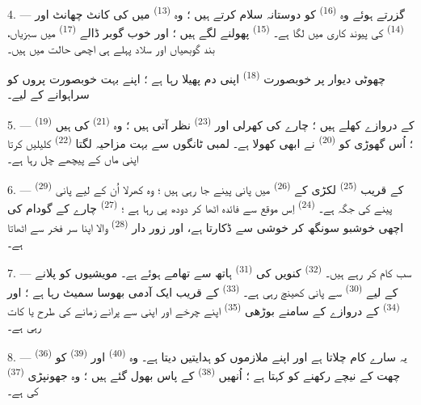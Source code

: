 4. --- گزرتے ہوئے وہ  \textsuperscript{(16)} کو دوستانہ
سلام کرتے ہیں ؛ وہ  \textsuperscript{(13)} میں
 کی کانٹ چھانٹ اور 
\textsuperscript{(14)} کی پیوند کاری میں لگا ہے۔  \textsuperscript{(15)} پھولنے لگے ہیں ؛ اور خوب گوبر ڈالے
 \textsuperscript{(17)} میں سبزیاں، بند گوبھیاں
اور سلاد پہلے ہی اچھی حالت میں ہیں۔

چھوٹی دیوار پر خوبصورت  \textsuperscript{(18)} اپنی دم
پھیلا رہا ہے ؛ اپنے بہت خوبصورت پروں کو سراہوانے کے لیے۔

\VUsaut{3.0mm}

5. ---  \textsuperscript{(19)} کے دروازے کھلے ہیں ؛
چارے کی کھرلی اور  \textsuperscript{(23)} نظر
آتی ہیں ؛ وہ  \textsuperscript{(21)} کی ہیں ؛ اُس گھوڑی
کو  \textsuperscript{(20)} نے ابھی کھولا ہے۔ لمبی
ٹانگوں سے بہت مزاحیہ لگتا  \textsuperscript{(22)}
کلیلیں کرتا اپنی ماں کے پیچھے چل رہا ہے۔

6. ---  \textsuperscript{(29)} کے قریب 
\textsuperscript{(25)} لکڑی کے  \textsuperscript{(26)} میں
پانی پینے جا رہی ہیں ؛ وہ کھرلا اُن کے لیے پانی پینے کی جگہ ہے۔
 \textsuperscript{(24)} اِس موقع سے فائدہ اٹھا کر دودھ
پی رہا ہے ؛  \textsuperscript{(27)} چارے کے گودام کی اچھی
خوشبو سونگھ کر خوشی سے ڈکارتا ہے، اور زور دار 
\textsuperscript{(28)} والا اپنا سر فخر سے اٹھاتا ہے۔

7. --- سب کام کر رہے ہیں۔  \textsuperscript{(32)}
کنویں کی  \textsuperscript{(31)} ہاتھ سے تھامے ہوئے ہے۔
مویشیوں کو پلانے کے لیے  \textsuperscript{(30)} سے پانی
کھینچ رہی ہے۔  \textsuperscript{(33)} کے قریب
ایک آدمی بھوسا سمیٹ رہا ہے ؛ اور  \textsuperscript{(34)}
کے دروازے کے سامنے بوڑھی 
\textsuperscript{(35)} اپنے چرخے اور اپنی  سے پرانے
زمانے کی طرح  یا  کات رہی ہے۔

\VUsaut{3.0mm}
\VUsaut{3.0mm}

8. ---  \textsuperscript{(36)} یہ سارے کام چلاتا ہے
اور اپنے ملازموں کو ہدایتیں دیتا ہے۔ وہ 
\textsuperscript{(40)} اور  \textsuperscript{(39)} کو چھت
کے نیچے رکھنے کو کہتا ہے ؛ اُنھیں 
\textsuperscript{(38)} کے پاس بھول گئے ہیں ؛ وہ جھونپڑی 
\textsuperscript{(37)} کی ہے۔


